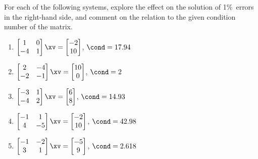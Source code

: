 \begin{exercise} \label{ex:} 
For each of the following systems, explore the effect on the solution of 1\%~errors in the right-hand side, and comment on the relation to the given condition number of the matrix.

\begin{enumerate}
\item \(\begin{bmatrix} 1&0
\\-4&1 \end{bmatrix}\xv
=\begin{bmatrix} -2
\\10 \end{bmatrix}\), 
\(\cond=17.94\)

\item \(\begin{bmatrix} 2&-4
\\-2&-1 \end{bmatrix}\xv
=\begin{bmatrix} 10
\\0 \end{bmatrix}\), 
\(\cond=2\)

\item \(\begin{bmatrix} -3&1
\\-4&2 \end{bmatrix}\xv
=\begin{bmatrix} 6\\8 \end{bmatrix}\), 
\(\cond=14.93\)

\item \(\begin{bmatrix} -1&1
\\4&-5 \end{bmatrix}\xv
=\begin{bmatrix} -2
\\10 \end{bmatrix}\), 
\(\cond=42.98\)

\item \(\begin{bmatrix} -1&-2
\\3&1 \end{bmatrix}\xv
=\begin{bmatrix} -5
\\9 \end{bmatrix}\), 
\(\cond=2.618\)

\end{enumerate}
\end{exercise}



